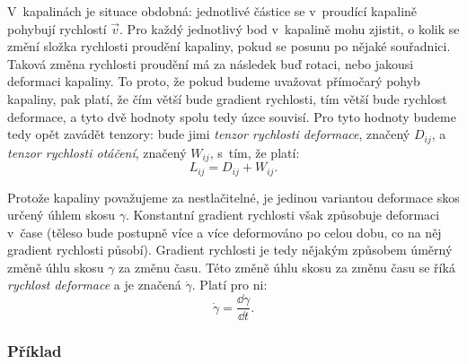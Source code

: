 \documentclass[12pt]{article}
\begin{document}
V~kapalinách je situace obdobná: jednotlivé částice se v~proudící kapalině pohybují rychlostí $\vec v$. Pro každý jednotlivý bod v~kapalině mohu zjistit, o kolik se změní složka rychlosti proudění kapaliny, pokud se posunu po nějaké souřadnici. Taková změna rychlosti proudění má za následek buď rotaci, nebo jakousi deformaci kapaliny. To proto, že pokud budeme uvažovat přímočarý pohyb kapaliny, pak platí, že čím větší bude gradient rychlosti, tím větší bude rychlost deformace, a tyto dvě hodnoty spolu tedy úzce souvisí. Pro tyto hodnoty budeme tedy opět zavádět tenzory: bude jimi \emph{tenzor rychlosti deformace}, značený $D_{ij}$, a \emph{tenzor rychlosti otáčení}, značený $W_{ij}$, s~tím, že platí:~\cite{wiki:Strain_rate_tensor}\cite{wiki:Simple_shear}\cite{Article:Shear_pure_and_simple}
\begin{equation}
    L_{ij} = D_{ij} + W_{ij}\text{.}
    \label{eq:rovnost_tenzoru}
\end{equation}
\par
Protože kapaliny považujeme za nestlačitelné, je jedinou variantou deformace skos určený úhlem skosu $\gamma$. Konstantní gradient rychlosti však způsobuje deformaci v~čase (těleso bude postupně více a více deformováno po celou dobu, co na něj gradient rychlosti působí). Gradient rychlosti je tedy nějakým způsobem úměrný změně úhlu skosu $\gamma$ za změnu času. Této změně úhlu skosu za změnu času se říká \emph{rychlost deformace} a je značená $\dot\gamma$. Platí pro ni:
\begin{equation}
    \dot\gamma = \frac{\dd\gamma}{\dd t}\text{.}
    \label{eq:dot_gamma}
\end{equation}

\subsubsection{Příklad}%
\end{document}
